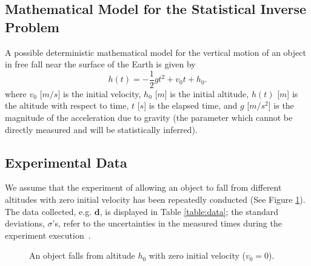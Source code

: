 \subsection{Mathematical Model for the Statistical Inverse Problem}



A possible deterministic mathematical model for the vertical motion of an object in free fall near the surface of the Earth is given by
\begin{equation}\label{eq:gravity01}
h(t)=-\frac{1}{2} g t^2 + v_0 t + h_0.
\end{equation}
where
$v_0$ [$m/s$] is the initial velocity,
$h_0$ [$m$] is the initial altitude,
$h(t)$ [$m$] is the altitude with respect to time,
$t$ [$s$] is the elapsed time, and
$g$ [$m/s^2$] is the magnitude of the acceleration due to gravity (the parameter which cannot be directly measured and will be statistically inferred).



\subsection{Experimental Data}
We assume that the experiment of allowing an object to fall from different altitudes with zero initial velocity has been repeatedly conducted (See Figure \ref{fig:free_fall}). The data collected, e.g.  $\mathbf{d}$, is displayed in Table \ref{table:data}; the standard deviations, $\sigma$'s, refer to the uncertainties in the measured times during the experiment execution~\cite{interactagram}. 



\begin{figure}[!h]
\centering

\vspace*{-8pt}
\caption{An object falls from altitude $h_0$ with zero initial velocity ($v_0=0$).}
\label{fig:free_fall}
\end{figure}


